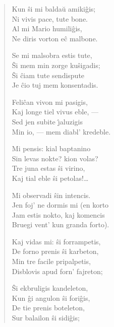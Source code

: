 \begin{verse}
                         \vin     Kun \^si mi balda\u u amiki\^gis;\\
                         \vin     Ni vivis pace, tute bone.\\
                        \vin      Al mi Mario humili\^gis,\\
                         \vin     Ne diris vorton e\^c malbone.

                        Se mi malsobra estis tute,\\
                        \^Si mem min zorge ku\^sigadis;\\
                        \^Si \^ciam tute sendispute\\
                        Je \^cio tuj mem konsentadis.

                        \vin      Feli\^can vivon mi pasigis,\\
                         \vin     Kaj longe tiel vivus eble, ---\\
                         \vin     Sed jen subite \^{\j}aluzigis\\
                         \vin     Min io, --- mem diabl' kredeble.

                        Mi pensis: kial baptanino\\
                        Sin levas nokte? kion volas?\\
                        Tre juna estas \^si virino,\\
                        Kaj tial eble \^si petolas!\dots

                         \vin     Mi observadi \^sin intencis.\\
                         \vin     Jen foj' ne dormis mi (en korto\\
                         \vin     Jam estis nokto, kaj komencis\\
                         \vin     Bruegi vent' kun granda forto).

                        Kaj vidas mi: \^si forrampetis,\\
                        De forno prenis \^si karbeton,\\
                        Min tre facile pripalpetis,\\
                        Disblovis apud forn' fajreton;

                          \vin    \^Si ekbruligis kandeleton,\\
                          \vin    Kun \^gi angulon \^si fori\^gis,\\
                          \vin    De tie prenis boteleton,\\
                         \vin     Sur balailon \^si sidi\^gis;


\end{verse}
